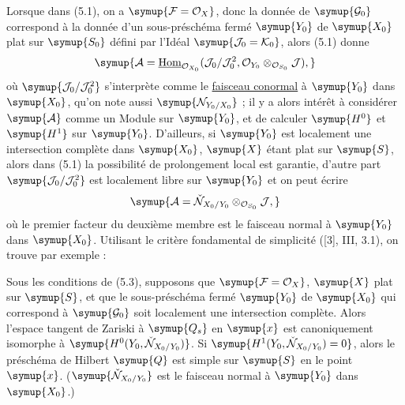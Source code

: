 Lorsque dans (5.1), on a $\symup{\mathcal F=\mathcal O_X}$, donc la donnée de
$\symup{\mathcal G_0}$ correspond à la donnée d'un sous-préschéma fermé $\symup{Y_0}$ de $\symup{X_0}$
plat sur $\symup{S_0}$ défini par l'Idéal $\symup{\mathcal J_0=\mathcal K_0}$, alors (5.1) donne
\[
\symup{\mathcal A=\underline{\operatorname{Hom}}_{\mathcal O_{X_0}}
(\mathcal J_0/\mathcal J_0^2,
\mathcal O_{Y_0}\otimes_{\mathcal O_{S_0}}\mathcal J),}
\]
où $\symup{\mathcal J_0/\mathcal J_0^2}$ s'interprète comme le \uline{faisceau conormal} à $\symup{Y_0}$
dans $\symup{X_0}$, qu'on note aussi
$\symup{\mathcal N_{Y_0/X_0}}$ ; il y a alors intérêt à considérer $\symup{\mathcal A}$
comme un Module sur $\symup{Y_0}$, et de calculer $\symup{H^0}$ et $\symup{H^1}$ sur $\symup{Y_0}$. D'ailleurs,
si $\symup{Y_0}$ est localement une intersection complète dans $\symup{X_0}$, $\symup{X}$ étant plat
sur $\symup{S}$, alors dans (5.1) la possibilité de prolongement local est garantie,
d'autre part $\symup{\mathcal J_0/\mathcal J_0^2}$ est localement libre sur $\symup{Y_0}$ et on peut
écrire
\[
\symup{\mathcal A=\check{\mathcal N}_{X_0/Y_0}\otimes_{\mathcal O_{S_0}}\mathcal J,}
\]
où le premier facteur du deuxième membre est le faisceau normal à $\symup{Y_0}$ dans
$\symup{X_0}$. Utilisant le critère fondamental de simplicité ([3], III, 3.1), on
trouve par exemple :

 Sous les conditions de (5.3), supposons que
$\symup{\mathcal F=\mathcal O_X}$, $\symup{X}$ plat sur $\symup{S}$, et que le sous-préschéma fermé
$\symup{Y_0}$ de $\symup{X_0}$ qui correspond à $\symup{\mathcal G_0}$ soit localement une intersection
complète. Alors l'espace tangent de Zariski à $\symup{Q_s}$ en $\symup{x}$ est canoniquement
isomorphe à $\symup{H^0(Y_0,\check{\mathcal N}_{X_0/Y_0})}$. Si
$\symup{H^1(Y_0,\check{\mathcal N}_{X_0/Y_0})=0}$, alors le préschéma de Hilbert
$\symup{Q}$ est simple sur $\symup{S}$ en le point $\symup{x}$.
($\symup{\check{\mathcal N}_{X_0/Y_0}}$ est le faisceau normal à $\symup{Y_0}$ dans $\symup{X_0}$.)

